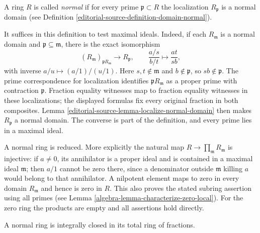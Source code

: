 \begin{definition}
\label{editorial-source-definition-ring-normal}
A ring $R$ is called {\it normal} if for every prime
$\mathfrak p \subset R$ the localization $R_{\mathfrak p}$ is
a normal domain (see Definition \ref{editorial-source-definition-domain-normal}).
\end{definition}

\noindent
It suffices in this definition to test maximal ideals. Indeed,
if each $R_{\mathfrak m}$ is a normal domain and
$\mathfrak p\subseteq\mathfrak m$, there is the exact isomorphism
$$
(R_{\mathfrak m})_{\mathfrak pR_{\mathfrak m}}
\longrightarrow R_{\mathfrak p},\qquad
\frac{a/s}{b/t}\longmapsto\frac{at}{sb},
$$
with inverse $a/u\mapsto(a/1)/(u/1)$.
Here $s,t\notin\mathfrak m$ and $b\notin\mathfrak p$, so
$sb\notin\mathfrak p$. The prime correspondence for localization
identifies $\mathfrak pR_{\mathfrak m}$ as a proper prime with
contraction $\mathfrak p$. Fraction equality witnesses map to
fraction equality witnesses in these localizations; the displayed
formulas fix every original fraction in both composites.
Lemma \ref{editorial-source-lemma-localize-normal-domain} then makes
$R_{\mathfrak p}$ a normal domain. The converse is part of the
definition, and every prime lies in a maximal ideal.

A normal ring is reduced. More explicitly the natural map
$R\to\prod_{\mathfrak m}R_{\mathfrak m}$ is injective: if
$a\ne0$, its annihilator is a proper ideal and is contained in
a maximal ideal $\mathfrak m$; then $a/1$ cannot be zero there,
since a denominator outside $\mathfrak m$ killing $a$ would
belong to that annihilator. A nilpotent element maps to zero
in every domain $R_{\mathfrak m}$ and hence is zero in $R$.
This also proves the stated subring assertion using all primes
(see Lemma \ref{algebra-lemma-characterize-zero-local}).
For the zero ring the products are empty and all assertions
hold directly.

\begin{lemma}
\label{editorial-source-lemma-normal-ring-integrally-closed}
A normal ring is integrally closed in its total ring of fractions.
\end{lemma}


